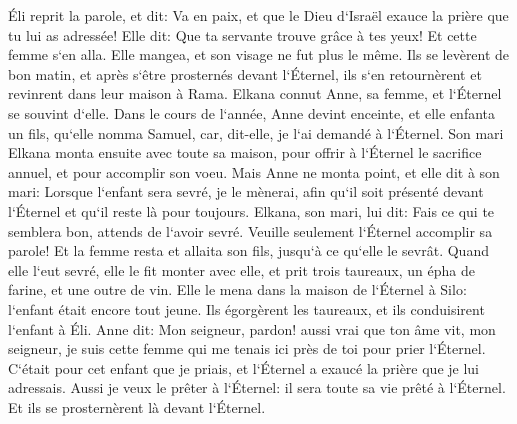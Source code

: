 \verse Éli reprit la parole, et dit: Va en paix, et que le Dieu d`Israël exauce la prière que tu lui as adressée! 
\verse Elle dit: Que ta servante trouve grâce à tes yeux! Et cette femme s`en alla. Elle mangea, et son visage ne fut plus le même. 
\verse Ils se levèrent de bon matin, et après s`être prosternés devant l`Éternel, ils s`en retournèrent et revinrent dans leur maison à Rama. Elkana connut Anne, sa femme, et l`Éternel se souvint d`elle. 
\verse Dans le cours de l`année, Anne devint enceinte, et elle enfanta un fils, qu`elle nomma Samuel, car, dit-elle, je l`ai demandé à l`Éternel. 
\verse Son mari Elkana monta ensuite avec toute sa maison, pour offrir à l`Éternel le sacrifice annuel, et pour accomplir son voeu. 
\verse Mais Anne ne monta point, et elle dit à son mari: Lorsque l`enfant sera sevré, je le mènerai, afin qu`il soit présenté devant l`Éternel et qu`il reste là pour toujours. 
\verse Elkana, son mari, lui dit: Fais ce qui te semblera bon, attends de l`avoir sevré. Veuille seulement l`Éternel accomplir sa parole! Et la femme resta et allaita son fils, jusqu`à ce qu`elle le sevrât. 
\verse Quand elle l`eut sevré, elle le fit monter avec elle, et prit trois taureaux, un épha de farine, et une outre de vin. Elle le mena dans la maison de l`Éternel à Silo: l`enfant était encore tout jeune. 
\verse Ils égorgèrent les taureaux, et ils conduisirent l`enfant à Éli. 
\verse Anne dit: Mon seigneur, pardon! aussi vrai que ton âme vit, mon seigneur, je suis cette femme qui me tenais ici près de toi pour prier l`Éternel. 
\verse C`était pour cet enfant que je priais, et l`Éternel a exaucé la prière que je lui adressais. 
\verse Aussi je veux le prêter à l`Éternel: il sera toute sa vie prêté à l`Éternel. Et ils se prosternèrent là devant l`Éternel. 

